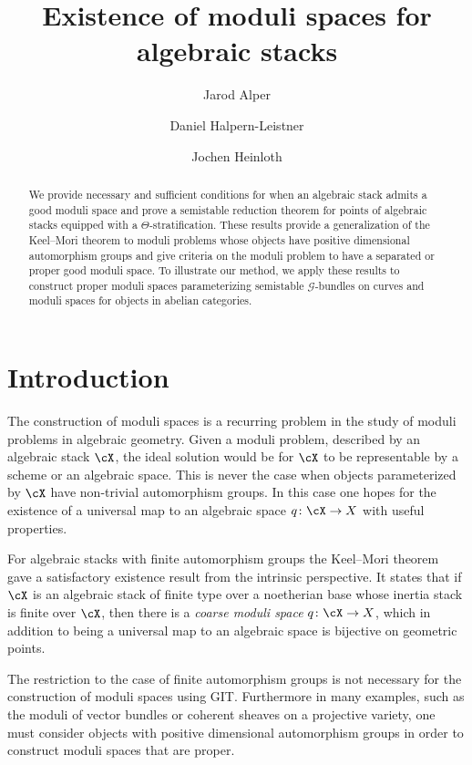 \documentclass[a4paper]{amsart}
\author[J.~Alper]{Jarod Alper}
\author[D.~Halpern-Leistner]{Daniel Halpern-Leistner}
\author[J.~Heinloth]{Jochen Heinloth}
\numberwithin{equation}{section}
\theoremstyle{plain}
\theoremstyle{definition}
\newcommand{\co}{\colon}
\begin{document}
\title{Existence of moduli spaces for algebraic stacks}

\begin{abstract}
We provide necessary and sufficient conditions for when an algebraic stack admits a good moduli space and prove a semistable reduction theorem for points of algebraic stacks equipped with a $\Theta$-stratification. These results provide a generalization of the Keel--Mori theorem to moduli problems whose objects have positive dimensional automorphism groups and give criteria on the moduli problem to have a separated or proper good moduli space. To illustrate our method, we apply these results to construct proper moduli spaces parameterizing semistable $\mathcal{G}$-bundles on curves and moduli spaces for objects in abelian categories.
\end{abstract}

\maketitle

\tableofcontents

\section{Introduction}

The construction of moduli spaces is a recurring problem in the study of moduli problems in algebraic geometry. Given a moduli problem, described by an algebraic stack $\cX$, the ideal solution would be for $\cX$ to be representable by a scheme or an algebraic space. This is never the case when objects parameterized by $\cX$ have non-trivial automorphism groups. In this case one hopes for the existence of a universal map to an algebraic space $q \co \cX \to X$ with useful properties.

For algebraic stacks with finite automorphism groups the Keel--Mori theorem \cite{keelmori} gave a satisfactory existence result from the intrinsic perspective. It states that if $\cX$ is an algebraic stack of finite type over a noetherian base whose inertia stack is finite over $\cX$, then there is a \emph{coarse moduli space} $q \co \cX \to X$, which in addition to being a universal map to an algebraic space is bijective on geometric points.

The restriction to the case of finite automorphism groups is not necessary for the construction of moduli spaces using GIT. Furthermore in many examples, such as the moduli of vector bundles or coherent sheaves on a projective variety, one must consider objects with positive dimensional automorphism groups in order to construct moduli spaces that are proper. 
\end{document}
